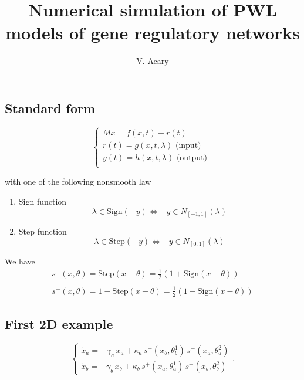\documentclass{article}
\title{Numerical simulation of PWL models of gene regulatory networks}
\author{V. Acary}
\begin{document}
\maketitle
\subsection*{Standard form}

\begin{equation}
  \label{eq:std}
  \left\{\begin{array}{l}
      M \dot x  = f(x,t) +  r(t) \\
      r(t) = g(x,t,\lambda) \text{ (input) }  \\
      y(t) = h(x,t,\lambda) \text{ (output) } \\
   \end{array}\right.
\end{equation}

with one of the following nonsmooth law
\begin{enumerate}
\item Sign function
  \begin{equation}
    \label{eq:sign}
    \lambda \in \mbox{Sign} (-y) \Longleftrightarrow  - y  \in N_{[-1,1]}(\lambda)
  \end{equation}
\item Step function
  \begin{equation}
    \label{eq:step}
    \lambda \in \mbox{Step} (-y) \Longleftrightarrow  - y  \in N_{[0,1]}(\lambda)
  \end{equation}
\end{enumerate}

We have 
\begin{equation}
  \label{eq:signstep}
  \begin{array}{l}
  s^+(x,\theta) = \mbox{Step}(x-\theta) = \frac 1 2 (1+ \mbox{Sign}(x-\theta))\\ \\
  s^-(x,\theta) = 1 - \mbox{Step}(x-\theta) = \frac 1 2 (1- \mbox{Sign}(x-\theta))
\end{array}
\end{equation}
\subsection*{First 2D example}
\begin{equation*}
\left\{\begin{array}{l} \dot{x}_{a} = - \gamma_{a}\, x_{a}+ \kappa_{a} \, s^{+}(x_{b},\theta_{b}^1)\, s^{-}(x_{a},\theta_{a}^2) \\
\dot{x}_{b} = - \gamma_{b}\, x_{b} + \kappa_{b} \,  s^{+}(x_{a},\theta_{a}^1)\,s^{-}(x_{b},\theta_{b}^2) \end{array}\right. .
\end{equation*}
\end{document}
